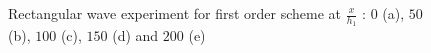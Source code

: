\documentclass[SingleSpace,12pt]{Serre_ASCE}
\begin{document}
\begin{figure}[htb]
\caption{Rectangular wave experiment for first order scheme at $\frac{x}{h_1}$ : $0$ (a), $50$ (b), $100$ (c), $150$ (d) and $200$ (e)}
\label{fig:Seguro1}
\end{figure}
\end{document}
